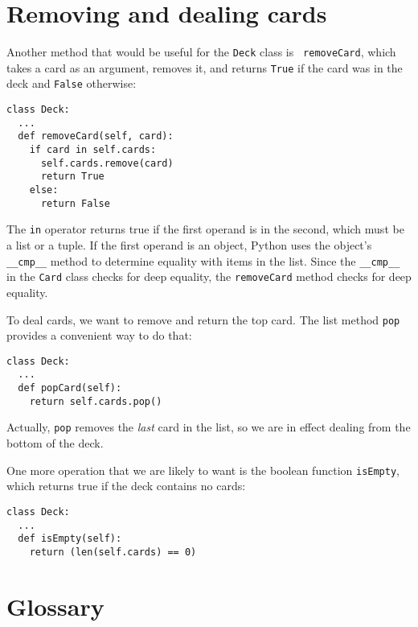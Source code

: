 \section{Removing and dealing cards}

Another method that would be useful for the {\tt Deck} class is {\tt
removeCard}, which takes a card as an argument, removes it, and
returns {\tt True} if the card was in the deck and {\tt False}
otherwise:

\beforeverb
\begin{verbatim}
class Deck:
  ...
  def removeCard(self, card):
    if card in self.cards:
      self.cards.remove(card)
      return True
    else: 
      return False
\end{verbatim}
\afterverb
%
The {\tt in} operator returns true if the first operand is in the
second, which must be a list or a tuple.  If the first operand is an
object, Python uses the object's {\tt \_\_cmp\_\_} method to determine
equality with items in the list.  Since the {\tt \_\_cmp\_\_} in the
{\tt Card} class checks for deep equality, the {\tt removeCard} method
checks for deep equality.


To deal cards, we want to remove and return the top card.
The list method {\tt pop} provides a convenient way to do that:

\beforeverb
\begin{verbatim}
class Deck:
  ...
  def popCard(self):
    return self.cards.pop()
\end{verbatim}
\afterverb
%
Actually, {\tt pop} removes the {\em last} card in the list, so we are in
effect dealing from the bottom of the deck.


One more operation that we are likely to want is the boolean function
{\tt isEmpty}, which returns true if the deck contains no cards:

\beforeverb
\begin{verbatim}
class Deck:
  ...
  def isEmpty(self):
    return (len(self.cards) == 0)
\end{verbatim}
\afterverb


\section{Glossary}


